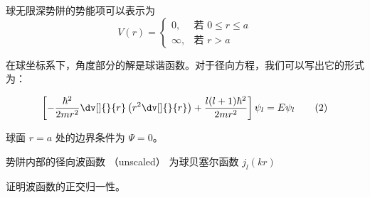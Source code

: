 
\begin{issues}
\issueDraft
\end{issues}


球无限深势阱的势能项可以表示为
$$
V(r)=
\begin{cases}
0,  & \text{若 $0\leq r\leq a$} \\
\infty, & \text{若 $r>a$}
\end{cases}\tag{1}
$$

在球坐标系下，角度部分的解是球谐函数。对于径向方程，我们可以写出它的形式为：

\begin{equation}
\left[-\frac{\hbar^2}{2mr^2} \dv[]{}{r}\left(r^2\dv[]{}{r}\right) + \frac{l(l + 1)\hbar^2}{2mr^2}\right]\psi_l = E\psi_l\tag{2}
\end{equation}

球面 $r = a$ 处的边界条件为 $\Psi = 0$。

势阱内部的径向波函数 （unscaled） 为球贝塞尔函数 $j_l(kr)$

证明波函数的正交归一性。
